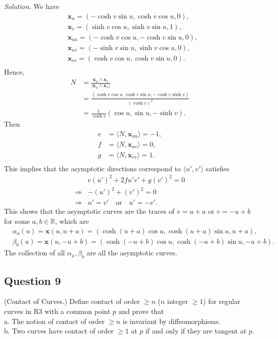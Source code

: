\documentclass[12pt]{article}
\begin{document}
\textit{Solution.} We have \begin{align*}
    &\mathbf{x}_u= (-\cosh{v}\sin{u},\cosh{v}\cos{u},0),\\
    &\mathbf{x}_v= (\sinh{v}\cos{u},\sinh{v}\sin{u},1),\\
    &\mathbf{x}_{uu}= (-\cosh{v}\cos{u},-\cosh{v}\sin{u},0),\\
    &\mathbf{x}_{uv}= (-\sinh{v}\sin{u},\sinh{v}\cos{u},0),\\
    &\mathbf{x}_{vv}= (\cosh{v}\cos{u},\cosh{v}\sin{u},0).\\
\end{align*}
Hence, \begin{align*}
    N &= \frac{\mathbf{x}_u\wedge \mathbf{x}_v}{|\mathbf{x}_u\wedge \mathbf{x}_v|}\\
    &=\frac{(\cosh{v}\cos{u},\cosh{v}\sin{u},-\cosh{v}\sinh{v})}{(\cosh{v})^2}\\
    &=\frac{1}{\cosh{v}}(\cos{u},\sin{u},-\sinh{v}).
\end{align*}
Then\begin{align*}
    e &= \langle N,\mathbf{x}_{uu}\rangle = -1,\\
    f &= \langle N,\mathbf{x}_{uv}\rangle = 0,\\
    g &= \langle N,\mathbf{x}_{vv}\rangle = 1.\\
\end{align*}
This implies that the asymptotic directions correspond to $\langle u',v'\rangle$ satisfies \begin{align*}
    &e(u')^2 + 2fu'v' + g(v')^2 = 0\\
    \Rightarrow &-(u')^2 + (v')^2 = 0\\
    \Rightarrow & u'=v' \quad\text{or}\quad u'=-v'.
\end{align*}
This shows that the asymptotic curves are the traces of $v=u+a$ or $v=-u+b$ for some $a,b\in\mathbb{R}$, which are \begin{align*}
    &\alpha_a(u) = \mathbf{x}(u,u+a) = (\cosh{(u+a)}\cos{u},\cosh{(u+a)}\sin{u},u+a),\\
    &\beta_b(u) = \mathbf{x}(u,-u+b) = (\cosh{(-u+b)}\cos{u},\cosh{(-u+b)}\sin{u},-u+b).
\end{align*}
The collection of all $\alpha_a,\beta_b$ are all the asymptotic curves.

\subsection*{Question 9}
(Contact of Curves.) Define contact of order $\geq n$ ($n$ integer $\geq 1$) for regular curves in R3 with a common point $p$ and prove that\\
a. The notion of contact of order $\geq n$ is invariant by diffeomorphisms.\\
b. Two curves have contact of order $\geq 1$ at $p$ if and only if they are tangent at $p$.\\
\end{document}
